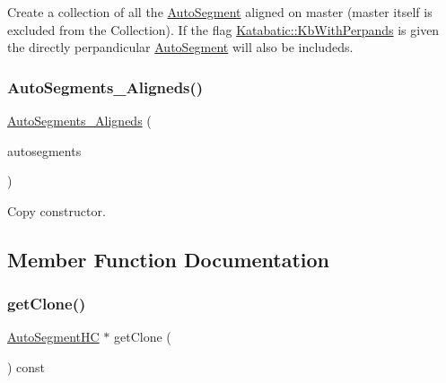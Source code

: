 Create a collection of all the \hyperlink{classKatabatic_1_1AutoSegment}{Auto\+Segment} aligned on {\ttfamily master} (master itself is excluded from the Collection). If the flag \hyperlink{namespaceKatabatic_a2af2ad6b6441614038caf59d04b3b217ae2d033c8f78b61468c827de8db5fe839}{Katabatic\+::\+Kb\+With\+Perpands} is given the directly perpandicular \hyperlink{classKatabatic_1_1AutoSegment}{Auto\+Segment} will also be includeds. \mbox{\label{classKatabatic_1_1AutoSegments__Aligneds_aade683d2c99dc069e2cd5c8b942f8912}} 
\subsubsection{\texorpdfstring{Auto\+Segments\+\_\+\+Aligneds()}{AutoSegments\_Aligneds()}\hspace{0.1cm}{\footnotesize\ttfamily [2/2]}}
{\footnotesize\ttfamily \hyperlink{classKatabatic_1_1AutoSegments__Aligneds}{Auto\+Segments\+\_\+\+Aligneds} (\begin{DoxyParamCaption}\item[{const \hyperlink{classKatabatic_1_1AutoSegments__Aligneds}{Auto\+Segments\+\_\+\+Aligneds} \&}]{autosegments }\end{DoxyParamCaption})\hspace{0.3cm}{\ttfamily [inline]}}

Copy constructor. 

\subsection{Member Function Documentation}
\mbox{\label{classKatabatic_1_1AutoSegments__Aligneds_a5b26b0698bdcb40cbf51b250dfb21858}} 
\subsubsection{\texorpdfstring{get\+Clone()}{getClone()}}
{\footnotesize\ttfamily \hyperlink{namespaceKatabatic_acb3628dc7705fefe38a665cfe43efa6e}{Auto\+Segment\+HC} $\ast$ get\+Clone (\begin{DoxyParamCaption}{ }\end{DoxyParamCaption}) const\hspace{0.3cm}{\ttfamily [virtual]}}

